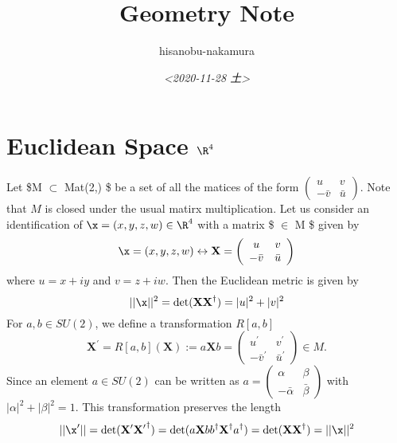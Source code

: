 \documentclass{article}
\author{hisanobu-nakamura}
\date{\textit{<2020-11-28 土>}}
\title{Geometry Note}
\begin{document}
\maketitle
\tableofcontents




\section{Euclidean Space $\R^4$}
\label{sec-1}
Let \$M $\subset$ Mat(2,\C) \$ be a set of all the matices of the form $\left(\begin{array}{cc}u & v \\-\bar{v} & \bar{u}\end{array}\right)$. Note that $M$ is closed under the usual matirx multiplication. Let us consider an identification of $\x = (x,y,z,w) \in \R^4$ with a matrix \$ $\in$ M \$ given by
\begin{equation}
\label{}
\x = (x,y,z,w) \leftrightarrow \bf{X} = \left(\begin{array}{cc}u & v \\-\bar{v} & \bar{u}\end{array}\right)
\end{equation}
where $u = x +iy$ and $v = z + iw$. Then the Euclidean metric is given by
\begin{equation}
\label{}
||\x||^2 = \det (\mathbf{XX}^{\dagger} ) = |u|^2 + |v|^2
\end{equation}
For $a,b \in SU(2)$, we define a transformation $R[a,b]$
\begin{equation}
\label{}
\mathbf{X}^{\prime} = R[a,b] (\mathbf{X}) := a\mathbf{X} b = \left(\begin{array}{cc}u^{\prime} & v^{\prime}  \\-\bar{v}^{\prime}  & \bar{u}^{\prime} \end{array}\right) \in M.
\end{equation}
Since an element $a \in SU(2)$ can be written as $a = \left(\begin{array}{cc}\alpha & \beta  \\-\bar{\alpha}  & \bar{\beta} \end{array}\right)$ with $|\alpha|^2 + |\beta|^2 = 1$.
This transformation preserves the length
\begin{equation}
\label{}
||\x^{\prime}|| = \det (\mathbf{X^{\prime}}\mathbf{X^{\prime}}^{\dagger} ) = \det (a\mathbf{X}bb^{\dagger}\mathbf{X}^{\dagger} a^{\dagger} ) = \det (\mathbf{XX}^{\dagger} ) = ||\x||^2 
\end{equation}
\end{document}
